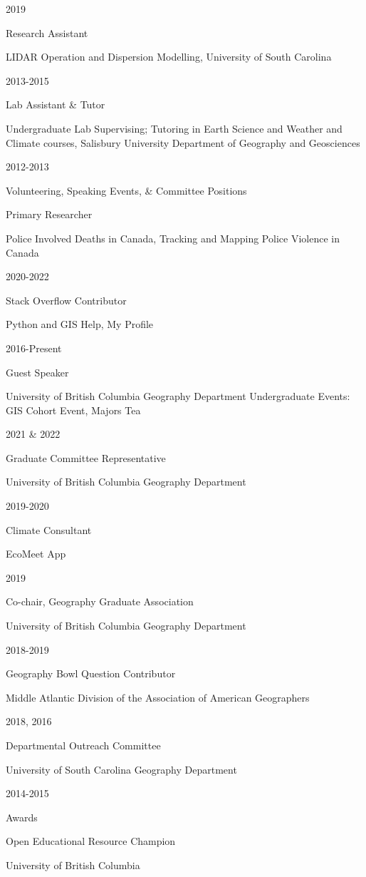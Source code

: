\documentclass[
]{article}
\begin{document}
2019

Research Assistant

LIDAR Operation and Dispersion Modelling, University of South Carolina

2013-2015

Lab Assistant \& Tutor

Undergraduate Lab Supervising; Tutoring in Earth Science and Weather and
Climate courses, Salisbury University Department of Geography and
Geosciences

2012-2013

Volunteering, Speaking Events, \& Committee Positions

Primary Researcher

Police Involved Deaths in Canada, Tracking and Mapping Police Violence
in Canada

2020-2022

Stack Overflow Contributor

Python and GIS Help, My Profile

2016-Present

Guest Speaker

University of British Columbia Geography Department Undergraduate
Events: GIS Cohort Event, Majors Tea

2021 \& 2022

Graduate Committee Representative

University of British Columbia Geography Department

2019-2020

Climate Consultant

EcoMeet App

2019

Co-chair, Geography Graduate Association

University of British Columbia Geography Department

2018-2019

Geography Bowl Question Contributor

Middle Atlantic Division of the Association of American Geographers

2018, 2016

Departmental Outreach Committee

University of South Carolina Geography Department

2014-2015

Awards

Open Educational Resource Champion

University of British Columbia
\end{document}
